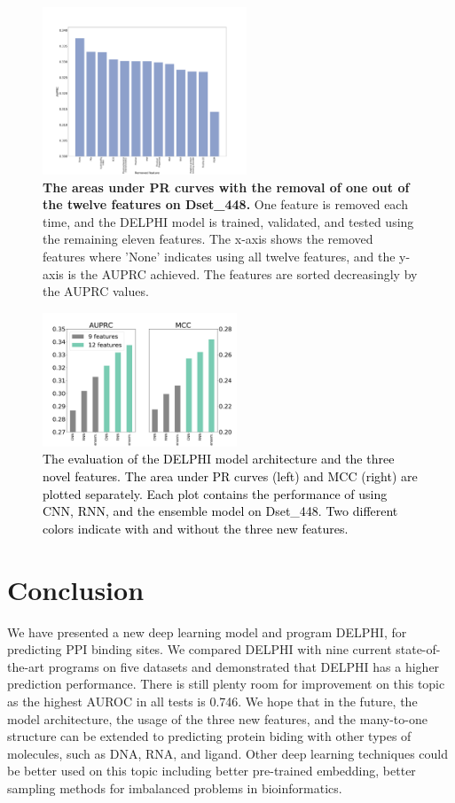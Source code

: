 \documentclass{bioinfo}
\newcommand{\myColor}{black}
\begin{document}
\begin{figure}
\centering
\includegraphics[width=\columnwidth, height=5cm]{remove_features_individually_Testing.pdf}
  \caption{\textbf{The areas under PR curves with the removal of one out of the twelve features on Dset\_448.} One feature is removed each time, and the DELPHI model is trained, validated, and tested using the remaining eleven features. The x-axis shows the removed features where 'None' indicates using all twelve features, and the y-axis is the AUPRC achieved. The features are sorted decreasingly by the AUPRC values. 
  \label{fig_remove_each_feature}}
\end{figure}

\begin{figure}
\centering
\includegraphics[width=\columnwidth, height = 4cm]{CNN_RNN_ensemble.pdf}
  \caption{\textcolor{\myColor}{{The evaluation of the DELPHI model architecture and the three novel features.} The area under PR curves (left) and MCC (right) are plotted separately. Each plot contains the performance of using CNN, RNN, and the ensemble model on Dset\_448. Two different colors indicate with and without the three new features.}
  \label{fig_CNN_RNN_ensemble}}
\end{figure}



\section{Conclusion}
We have presented a new deep learning model and program DELPHI, for predicting PPI binding sites. We compared DELPHI with nine current state-of-the-art programs on five datasets and demonstrated that DELPHI has a higher prediction performance. There is still plenty room for improvement on this topic as the highest AUROC in all tests is 0.746. 
We hope that in the future, the model architecture, the usage of the three new features, and the many-to-one structure can be extended to predicting protein biding with other types of molecules, such as DNA, RNA, and ligand. Other deep learning techniques could be better used on this topic including better pre-trained embedding, better sampling methods for imbalanced problems in bioinformatics. 
\end{document}
